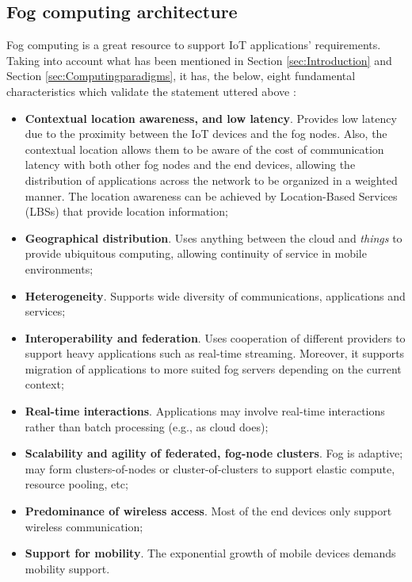 \subsection{Fog computing architecture}
\label{sec:fog_architecture}
Fog computing is a great resource to support IoT applications' requirements. Taking into account what has been mentioned in Section \ref{sec:Introduction} and Section \ref{sec:Computingparadigms}, it has, the below, eight fundamental characteristics which validate the statement uttered above \cite{iorga2018fog}:
\begin{itemize}
	\item \textbf{Contextual location awareness, and low latency}. Provides low latency due to the proximity between the IoT devices and the fog nodes. Also, the contextual location allows them to be aware of the cost of communication latency with both other fog nodes and the end devices, allowing the distribution of applications across the network to be organized in a weighted manner. The location awareness can be achieved by Location-Based Services (LBSs) that provide location information;
	\item \textbf{Geographical distribution}. Uses anything between the cloud and \textit{things} to provide ubiquitous computing, allowing continuity of service in mobile environments;
	\item \textbf{Heterogeneity}. Supports wide diversity of communications, applications and services;
	\item \textbf{Interoperability and federation}. Uses cooperation of different providers to support heavy applications such as real-time streaming. Moreover, it supports migration of applications to more suited fog servers depending on the current context;
	\item \textbf{Real-time interactions}. Applications may involve real-time interactions rather than batch processing (e.g., as cloud does);
	\item \textbf{Scalability and agility of federated, fog-node clusters}. Fog is adaptive; may form clusters-of-nodes or cluster-of-clusters to support elastic compute, resource pooling, etc;
	\item \textbf{Predominance of wireless access}. Most of the end devices only support wireless communication;
	\item \textbf{Support for mobility}. The exponential growth of mobile devices demands mobility support.
\end{itemize}

